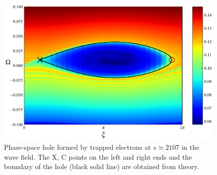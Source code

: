 \begin{figure}[htbp]
    \centering
    \includegraphics[scale=0.5]{cpc_img/fig_hole.pdf}
    \caption{Phase-space hole  formed by trapped electrons at $s\simeq 2107$ in the wave field. The X, C points on the left and right ends and the boundary of the hole (black solid line) are obtained from theory.}
    \label{fig.hole}
\end{figure}



